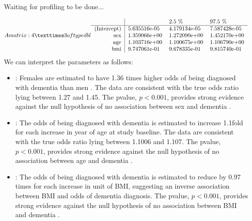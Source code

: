 \documentclass[letterpaper,10pt,english]{jupyterBook}
\begin{document}
\begin{sphinxVerbatim}[commandchars=\\\{\}]
 
\end{sphinxVerbatim}

\begin{sphinxVerbatim}[commandchars=\\\{\}]
Waiting for profiling to be done...
\end{sphinxVerbatim}
\begin{equation*}
\begin{split}A matrix: 4 × 3 of type dbl
\begin{tabular}{r|lll}
  &  & 2.5 \% & 97.5 \%\\
\hline
	(Intercept) & 5.635516e-05 & 4.179134e-05 & 7.587428e-05\\
	sex & 1.359066e+00 & 1.272090e+00 & 1.452170e+00\\
	age & 1.103716e+00 & 1.100675e+00 & 1.106790e+00\\
	bmi & 9.747061e-01 & 9.678335e-01 & 9.815740e-01\\
\end{tabular}\end{split}
\end{equation*}
\sphinxAtStartPar
We can interpret the parameters as follows:
\begin{itemize}
\item {} 
\sphinxAtStartPar
{}: Females are estimated to have 1.36 times higher odds of being diagnosed with dementia than men . The data are consistent with the true odds ratio lying between 1.27 and 1.45. The p\sphinxhyphen{}value, \(p<0.001\), provides strong evidence against the null hypothesis of no association between sex and dementia . 

\item {} 
\sphinxAtStartPar
{}: The odds of being diagnosed with dementia is estimated to increase 1.1\sphinxhyphen{}fold for each increase in year of age at study baseline. The data are consistent with the true odds ratio lying between 1.1006 and 1.107.  The p\sphinxhyphen{}value, \(p<0.001\), provides strong evidence against the null hypothesis of no association between age and dementia . 

\item {} 
\sphinxAtStartPar
{}: The odds of being diagnosed with dementia is estimated to reduce by 0.97 times for each increase in unit of BMI, suggesting an inverse association between BMI and odds of dementia diagnosis.  The p\sphinxhyphen{}value, \(p<0.001\), provides strong evidence against the null hypothesis of no association between BMI and dementia . 

\end{itemize}
\end{document}
